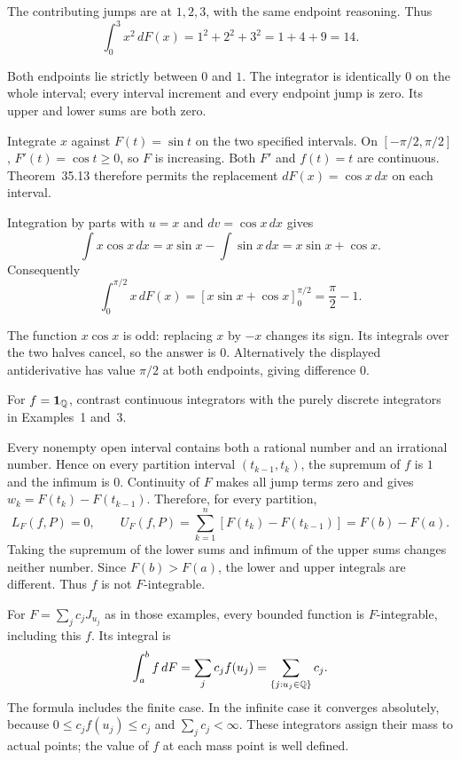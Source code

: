 The contributing jumps are at $1,2,3$, with the same endpoint
reasoning. Thus
\[
 \int_0^3x^2\,dF(x)=1^2+2^2+3^2=1+4+9=14.
\]

Both endpoints lie strictly between $0$ and $1$. The integrator is
identically $0$ on the whole interval; every interval increment and
every endpoint jump is zero. Its upper and lower sums are both zero.

\goal Integrate $x$ against $F(t)=\sin t$ on the two specified intervals.
On $[-\pi/2,\pi/2]$, $F'(t)=\cos t\ge0$, so $F$ is increasing.
Both $F'$ and $f(t)=t$ are continuous. Theorem~35.13 therefore
permits the replacement $dF(x)=\cos x\,dx$ on each interval.

Integration by parts with $u=x$ and $dv=\cos x\,dx$ gives
\[
 \int x\cos x\,dx=x\sin x-\int\sin x\,dx
                  =x\sin x+\cos x.
\]
Consequently
\[
 \int_0^{\pi/2}x\,dF(x)
 =\left[x\sin x+\cos x\right]_0^{\pi/2}
 =\frac\pi2-1.
\]

The function $x\cos x$ is odd: replacing $x$ by $-x$ changes its
sign. Its integrals over the two halves cancel, so the answer is
$0$. Alternatively the displayed antiderivative has value $\pi/2$
at both endpoints, giving difference $0$.

\goal For $f=\mathbf{1}_{\mathbb{Q}}$, contrast continuous integrators
with the purely discrete integrators in Examples~1 and~3.

Every nonempty open interval contains both a rational number and
an irrational number. Hence on every partition interval
$(t_{k-1},t_k)$, the supremum of $f$ is $1$ and the infimum is $0$.
Continuity of $F$ makes all jump terms zero and gives
$w_k=F(t_k)-F(t_{k-1})$. Therefore, for every partition,
\[
 L_F(f,P)=0,\qquad
 U_F(f,P)=\sum_{k=1}^n[F(t_k)-F(t_{k-1})]=F(b)-F(a).
\]
Taking the supremum of the lower sums and infimum of the upper
sums changes neither number. Since $F(b)>F(a)$, the lower and
upper integrals are different. Thus $f$ is not $F$-integrable.

For $F=\sum_jc_jJ_{u_j}$ as in those examples, every bounded
function is $F$-integrable, including this $f$. Its integral is
\[
 \int_a^bf\,dF=\sum_jc_jf(u_j)
              =\sum_{\{j:u_j\in\mathbb{Q}\}}c_j.
\]
The formula includes the finite case. In the infinite case it
converges absolutely, because $0\le c_jf(u_j)\le c_j$ and
$\sum_jc_j<\infty$. These integrators assign their mass to actual
points; the value of $f$ at each mass point is well defined.

